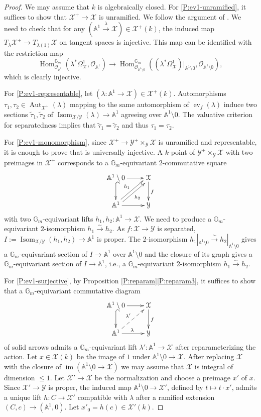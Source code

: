 \documentclass[a4paper]{amsart}
\theoremstyle{plain}
\theoremstyle{definition}
\theoremstyle{remark}
\numberwithin{equation}{section}
\newcommand{\GG}{\mathbb{G}}
\renewcommand\AA{\mathbb{A}}
\newcommand\cX{\mathcal{X}}
\newcommand\cY{\mathcal{Y}}
\newcommand\oh{\mathcal{O}}
\newcommand\co{\colon}
\renewcommand{\tilde}{\widetilde}
\newcommand{\iso}{\stackrel{\sim}{\to}}
\DeclareMathOperator{\ev}{ev}
\DeclareMathOperator{\Isom}{Isom}
\DeclareMathOperator{\Aut}{Aut}
\DeclareMathOperator{\Hom}{Hom}
\DeclareMathOperator{\im}{im}
\begin{document}
\begin{proof}
We may assume that $k$ is algebraically closed.
For \eqref{P:ev1-unramified}, it suffices to show that $\cX^+ \to \cX$ is unramified.  We follow the argument of \cite[Prop.~1.4.11(1)]{drinfeld}.  We need to check that for any $(\AA^1 \xrightarrow{\lambda} \cX) \in \cX^+(k)$, the induced map $T_{\lambda} \cX^+ \to T_{\lambda(1)} \cX$ on tangent spaces is injective.  This map can be identified with the restriction map
\[
\Hom_{\oh_{\AA^1}}^{\GG_m}(\lambda^* \Omega_{\cX}^1, \oh_{\AA^1}) \to \Hom_{\oh_{\AA^1 \setminus 0}}^{\GG_m}((\lambda^* \Omega_{\cX}^1)|_{\AA^1 \setminus 0}, \oh_{\AA^1 \setminus 0}),
\]
which is clearly injective.

For \eqref{P:ev1-representable}, let  $(\lambda \co \AA^1 \to \cX) \in \cX^+(k)$. Automorphisms $\tau_1, \tau_2 \in \Aut_{\cX^+}(\lambda)$ mapping to the same automorphism of $\ev_f(\lambda)$ induce two sections $\tilde{\tau}_1, \tilde{\tau}_2$ of $\Isom_{\cX/\cY}(\lambda) \to \AA^1$ agreeing over $\AA^1 \setminus 0$.  The valuative criterion for separatedness implies that $\tilde{\tau}_1 = \tilde{\tau}_2$ and thus $\tau_1 = \tau_2$.

For \eqref{P:ev1-monomorphism}, since  $\cX^+ \to \cY^+ \times_{\cY} \cX$  is unramified and representable, it is enough to prove that is universally injective. A $k$-point of $\cY^+ \times_{\cY} \cX$ with two preimages in $\cX^+$ corresponds to a $\GG_m$-equivariant $2$-commutative square
$$\xymatrix{
\AA^1 \setminus 0 \ar@{^(->}[d] \ar[r]								&  	\cX \ar[d]^f\\
\AA^1  \ar[r] \ar@<0.5ex>[ur]^{h_1} \ar@<-0.5ex>[ur]_{h_2}	& \cY
}$$
with two $\GG_m$-equivariant lifts $h_1, h_2 \co \AA^1 \to \cX$. We need to produce a $\GG_m$-equivariant $2$-isomorphism $h_1\iso h_2$. As $f \co \cX \to \cY$ is separated, $I:=\Isom_{\cX/\cY}(h_1, h_2) \to \AA^1$ is proper. The 2-isomorphism $h_1|_{\AA^1 \setminus 0} \iso h_2|_{\AA^1 \setminus 0}$ gives a $\GG_m$-equivariant section of $I\to \AA^1$ over $\AA^1 \setminus 0$ and the closure of its graph gives a $\GG_m$-equivariant section of $I\to \AA^1$, i.e., a $\GG_m$-equivariant 2-isomorphism $h_1 \iso h_2$.

For \eqref{P:ev1-surjective}, by Proposition \ref{P:reparam}\eqref{P:reparam3}, it suffices to show that a $\GG_m$-equivariant commutative diagram
$$\xymatrix{
\AA^1 \setminus 0 \ar[r] \ar@{^(->}[d]				& \cX \ar[d]^f \\
\AA^1 \ar[r]^{\lambda} \ar@{-->}[ur]^{\lambda'}						& \cY
}$$
of solid arrows admits a $\GG_m$-equivariant lift $\lambda' \co \AA^1 \to \cX$ after
reparameterizing the action.  Let $x \in \cX(k)$ be the image of $1$ under $\AA^1 \setminus 0 \to \cX$.  After replacing $\cX$ with the closure of $\im(\AA^1 \setminus 0 \to \cX)$ we may assume that $\cX$ is integral  of dimension $\le 1$.  Let $\cX' \to \cX$ be the normalization and choose a preimage $x'$ of $x$.  Since $\cX' \to \cY$ is proper, the induced map $\AA^1 \setminus 0 \to \cX'$, defined by $t \mapsto t \cdot x'$, admits a unique lift $h \co C \to \cX'$ compatible with $\lambda$ after a ramified extension $(C,c) \to (\AA^1,0)$.   Let $x'_0 = h(c) \in \cX'(k)$.


\end{proof}
\end{document}
